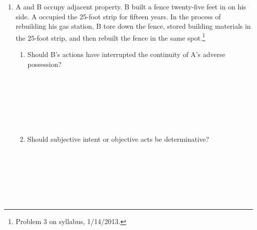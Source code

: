 \begin{enumerate}
    \item A and B occupy adjacent property. B built a fence twenty-five feet 
    in on his side. A occupied the 25-foot strip for fifteen years. In the 
    process of rebuilding his gas station, B tore down the fence, stored 
    building materials in the 25-foot strip, and then rebuilt the fence in the 
    same spot.\footnote{Problem 3 on syllabus, 1/14/2013.}
    \begin{enumerate}
        \item Should B's actions have interrupted the continuity of A's 
        adverse possession?
        ~\\\\\\\\\\\\\\
        \item Should subjective intent or objective acts be determinative?
        ~\\\\\\\\\\\\\\
    \end{enumerate}
\end{enumerate}



